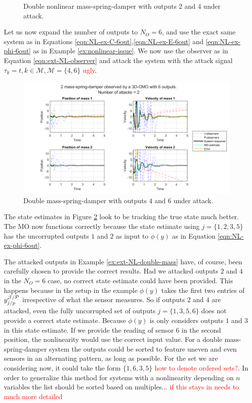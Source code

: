 \begin{example}
\begin{figure}[H]
        \caption{Double nonlinear mass-spring-damper with outputs 2 and 4 under attack.}
        \label{fig:extended_nonlinear_not_functional}
    \end{figure}
    Let us now expand the number of outputs to $N_O=6$, and use the exact same system as in Equations \eqref{eqn:NL-ex-C-6out},\eqref{eqn:NL-ex-E-6out} and \eqref{eqn:NL-ex-phi-6out} as in Example \ref{ex:nonlinear-issue}. We now use the observer as in Equation \eqref{eqn:ext-NL-observer} and attack the system with the attack signal $\tau_k=t,k \in \mathcal{M},\mathcal{M}=\{4,6\}$ \textcolor{red}{ugly}.
    \begin{figure}[H]
        \centering
        \includegraphics[width=\linewidth]{report/Figures/extended-nonlinear-functional.png}
        \caption{Double mass-spring-damper with outputs $4$ and $6$ under attack.}
        \label{fig:extended-nonlinear-functional}
    \end{figure}
    The state estimates in Figure \ref{fig:extended-nonlinear-functional} look to be tracking the true state much better. The MO now functions correctly because the state estimate using $j=\{1,2,3,5\}$ has the uncorrupted outputs $1$ and $2$ as input to $\phi(y)$ as in Equation \eqref{eqn:NL-ex-phi-6out}.
\end{example}
The attacked outputs in Example \ref{ex:ext-NL-double-mass} have, of course, been carefully chosen to provide the correct results. Had we attacked outputs $2$ and $4$ in the $N_O=6$ case, no correct state estimate could have been provided. This happens because in the setup in the example $\phi(y)$ takes the first two entries of $y^{\mathcal{J}/\mathcal{P}}_{j/p}$ irrespective of what the sensor measures. So if outputs $2$ and $4$ are attacked, even the fully uncorrupted set of outputs $j=\{1,3,5,6\}$ does not provide a correct state estimate. Because $\phi(y)$ is only considers outputs $1$ and $3$ in this state estimate. If we provide the reading of sensor $6$ in the second position, the nonlinearity would use the correct input value. For a double mass-spring-damper system the outputs could be sorted to feature uneven and even sensors in an alternating pattern, as long as possible. For the set we are considering now, it could take the form $\{1,6,3,5\}$ \textcolor{red}{how to denote ordered sets?}. In order to generalize this method for systems with a nonlinearity depending on $n$ variables the list should be sorted based on multiples... \textcolor{red}{if this stays in needs to much more detailed}

